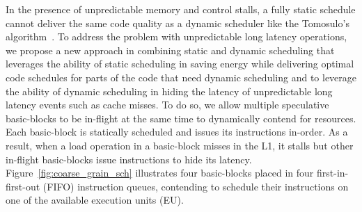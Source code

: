 In the presence of unpredictable memory and control stalls, a fully static
schedule cannot deliver the same code quality as a dynamic scheduler like the
Tomosulo's algorithm~\cite{tomasulo}. To address the problem with unpredictable
long latency operations, we propose a new approach in combining static and
dynamic scheduling that leverages the ability of static scheduling in saving
energy while delivering optimal code schedules for parts of the code that need
dynamic scheduling and to leverage the ability of dynamic scheduling in hiding
the latency of unpredictable long latency events such as cache misses. To do so,
    we allow multiple speculative basic-blocks to be in-flight at the same time
    to dynamically contend for resources.  Each basic-block is statically
    scheduled and issues its instructions in-order.  As a result, when a load
    operation in a basic-block misses in the L1, it stalls but other in-flight
    basic-blocks issue instructions to hide its latency.
    Figure~\ref{fig:coarse_grain_sch} illustrates four basic-blocks placed in
    four first-in-first-out (FIFO) instruction queues, contending to schedule
    their instructions on one of the available execution units (EU).
